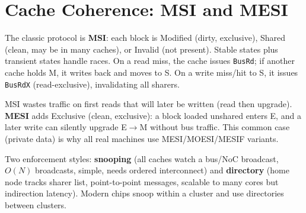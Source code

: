 \begin{center}
\end{center}

\section{Cache Coherence: MSI and MESI}
The classic protocol is \textbf{MSI}: each block is Modified (dirty, exclusive), Shared
(clean, may be in many caches), or Invalid (not present). Stable states plus transient
states handle races. On a read miss, the cache issues \texttt{BusRd}; if another cache
holds M, it writes back and moves to S. On a write miss/hit to S, it issues
\texttt{BusRdX} (read-exclusive), invalidating all sharers.

MSI wastes traffic on first reads that will later be written (read then upgrade).
\textbf{MESI} adds Exclusive (clean, exclusive): a block loaded unshared enters E, and a
later write can silently upgrade E$\to$M without bus traffic. This common case (private
data) is why all real machines use MESI/MOESI/MESIF variants.

Two enforcement styles: \textbf{snooping} (all caches watch a bus/NoC broadcast, $O(N)$
broadcasts, simple, needs ordered interconnect) and \textbf{directory} (home node tracks
sharer list, point-to-point messages, scalable to many cores but indirection latency).
Modern chips snoop within a cluster and use directories between clusters.

